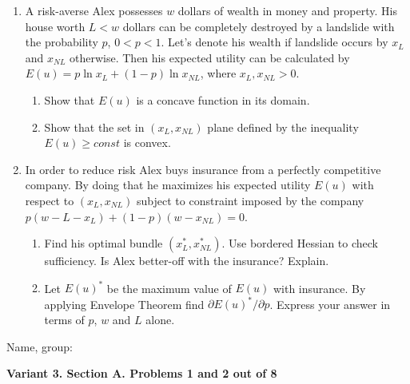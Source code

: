 \documentclass[12pt,a4paper]{article}
\begin{document}
\begin{enumerate}[resume]
\item A risk-averse Alex possesses $w$ dollars of wealth in money and property.  His house worth $L < w$ dollars can be completely destroyed by a landslide with the probability $p$, $0 < p < 1$. Let’s denote his wealth if landslide occurs by $x_L$ and $x_{NL}$ otherwise. Then his expected utility can be calculated by $E(u) = p \ln x_L + (1-p) \ln x_{NL}$, where $x_L, x_{NL} > 0$.
\begin{enumerate}
\item Show that $E(u)$ is a concave function in its domain.
\item Show that the set in  $(x_L, x_{NL})$ plane defined by the inequality $E(u)\geq const$  is convex.
\end{enumerate}

\item In order to reduce risk Alex buys insurance from a perfectly competitive company. By doing that he maximizes his expected utility $E(u)$ with respect to $(x_L, x_{NL})$ subject to constraint imposed by the company $p(w-L-x_L)+(1-p)(w-x_{NL})=0$.
\begin{enumerate}
\item  Find his optimal bundle  $(x_L^*, x_{NL}^*)$. Use bordered Hessian to check sufficiency. Is Alex better-off with the insurance? Explain.
\item Let $E(u)^*$ be the maximum value of $E(u)$ with insurance. By applying Envelope Theorem find $\partial E(u)^* / \partial p$. Express your answer in terms of $p$, $w$ and $L$ alone.
\end{enumerate}


\end{enumerate}

\begin{framed}
\begin{minipage}{42em}
Name, group:\vspace*{3ex}\par 
\noindent\dotfill
\end{minipage}
\end{framed}


\newpage

\textbf{Variant 3. Section A. Problems 1 and 2 out of 8}
\end{document}

